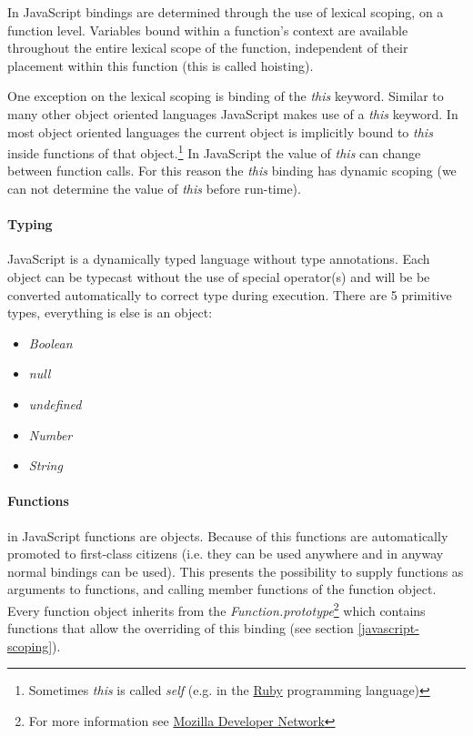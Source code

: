 In JavaScript bindings are determined through the use of lexical scoping, on a function level. Variables bound within a function's context are available throughout the entire lexical scope of the function, independent of their placement within this function (this is called hoisting).

One exception on the lexical scoping is binding of the \textit{this} keyword. Similar to many other object oriented languages JavaScript makes use of a \textit{this} keyword. In most object oriented languages the current object is implicitly bound to \textit{this} inside functions of that object.\footnote{Sometimes \textit{this} is called \textit{self} (e.g. in the \href{http://ruby.org}{Ruby} programming language)} In JavaScript the value of \textit{this} can change between function calls. For this reason the \textit{this} binding has dynamic scoping (we can not determine the value of \textit{this} before run-time).

\paragraph{Typing} \label{javascript-typing}
JavaScript is a dynamically typed language without type annotations. Each object can be typecast without the use of special operator(s) and will be be converted automatically to correct type during execution. There are 5 primitive types, everything is else is an object:

\begin{itemize}
	\item \textit{Boolean}
	\item \textit{null}
	\item \textit{undefined}
	\item \textit{Number}
	\item \textit{String}
\end{itemize}

\paragraph{Functions} \label{javascript-functions}
in JavaScript functions are objects. Because of this functions are automatically promoted to first-class citizens (i.e. they can be used anywhere and in anyway normal bindings can be used). This presents the possibility to supply functions as arguments to functions, and calling member functions of the function object. Every function object inherits from the \textit{Function.prototype}\footnote{For more information see \href{https://developer.mozilla.org/en-US/docs/Web/JavaScript/Reference/Global_Objects/Function/prototype}{Mozilla Developer Network}} which contains functions that allow the overriding of this binding (see section \ref{javascript-scoping}).

